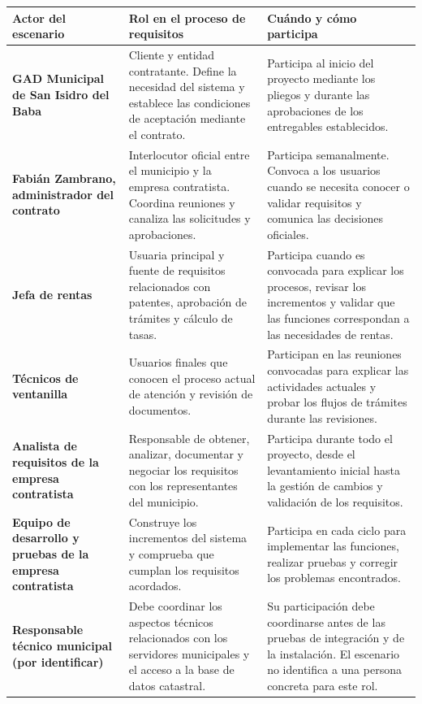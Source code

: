 \documentclass[10pt,letterpaper]{article}
\begin{document}
\begin{tabularx}{\linewidth}{@{}p{4.6cm}Y Y@{}}
\color{white}\textbf{Actor del escenario}&\color{white}\textbf{Rol en el proceso de requisitos}&\color{white}\textbf{Cuándo y cómo participa}\\\midrule
\textbf{GAD Municipal de San Isidro del Baba}&Cliente y entidad contratante. Define la necesidad del sistema y establece las condiciones de aceptación mediante el contrato.&Participa al inicio del proyecto mediante los pliegos y durante las aprobaciones de los entregables establecidos.\\
\textbf{Fabián Zambrano, administrador del contrato}&Interlocutor oficial entre el municipio y la empresa contratista. Coordina reuniones y canaliza las solicitudes y aprobaciones.&Participa semanalmente. Convoca a los usuarios cuando se necesita conocer o validar requisitos y comunica las decisiones oficiales.\\
\textbf{Jefa de rentas}&Usuaria principal y fuente de requisitos relacionados con patentes, aprobación de trámites y cálculo de tasas.&Participa cuando es convocada para explicar los procesos, revisar los incrementos y validar que las funciones correspondan a las necesidades de rentas.\\
\textbf{Técnicos de ventanilla}&Usuarios finales que conocen el proceso actual de atención y revisión de documentos.&Participan en las reuniones convocadas para explicar las actividades actuales y probar los flujos de trámites durante las revisiones.\\
\textbf{Analista de requisitos de la empresa contratista}&Responsable de obtener, analizar, documentar y negociar los requisitos con los representantes del municipio.&Participa durante todo el proyecto, desde el levantamiento inicial hasta la gestión de cambios y validación de los requisitos.\\
\textbf{Equipo de desarrollo y pruebas de la empresa contratista}&Construye los incrementos del sistema y comprueba que cumplan los requisitos acordados.&Participa en cada ciclo para implementar las funciones, realizar pruebas y corregir los problemas encontrados.\\
\textbf{Responsable técnico municipal (por identificar)}&Debe coordinar los aspectos técnicos relacionados con los servidores municipales y el acceso a la base de datos catastral.&Su participación debe coordinarse antes de las pruebas de integración y de la instalación. El escenario no identifica a una persona concreta para este rol.\\
\end{tabularx}
\end{document}

